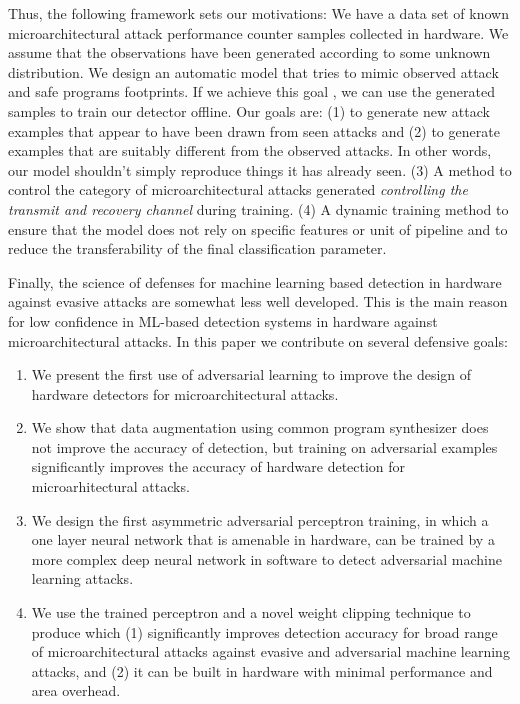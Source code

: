  
 Thus, the following framework sets our motivations:
  We have a data set of known   microarchitectural attack performance counter samples collected in hardware. 
 We assume that the observations have been generated according to some unknown distribution. 
 We design an automatic model that tries to mimic observed attack and safe programs footprints. If we achieve this goal , we can use the generated samples to train our detector offline. Our goals are: (1) to generate new attack examples that appear to have been drawn from seen attacks and (2) to generate examples that are suitably different from the observed attacks. In other words, our model shouldn't simply reproduce things it has already seen. (3) A method to control the category of microarchitectural attacks generated {\em controlling the transmit and recovery channel} during training. (4) A dynamic training method to ensure that the model does not rely on specific features or unit of pipeline and to reduce the  transferability of the final classification parameter. 
 
 
 
Finally, the science of defenses for machine learning based  detection in hardware against evasive attacks are somewhat less well developed. This is the main reason for low confidence in ML-based detection systems in hardware against microarchitectural attacks. In this paper we contribute on several defensive goals:

\begin{enumerate}
\item We present the first use of adversarial learning to improve the
design of hardware detectors for microarchitectural attacks. 
\vspace{2mm}

\item We show that data augmentation using common program synthesizer does not improve the accuracy of detection, but training on adversarial examples significantly improves the accuracy of hardware detection for microarhitectural attacks. 

\item We design the first asymmetric  adversarial perceptron training, in which a one layer neural network that is amenable in hardware, can be trained  by a more complex deep neural network in software to detect adversarial machine learning attacks.


\item We use the trained perceptron and a novel weight clipping technique to produce \scheme{} which (1) significantly improves detection accuracy for broad range of microarchitectural attacks against evasive and adversarial machine learning attacks, and (2) it can be built in hardware with minimal performance and area overhead. 
\end{enumerate}
